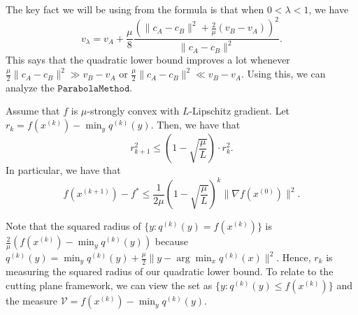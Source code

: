 The key fact we will be using from the formula is that when $0<\lambda<1$,
we have
\[
v_{\lambda}=v_{A}+\frac{\mu}{8}\frac{(\|c_{A}-c_{B}\|^{2}+\frac{2}{\mu}(v_{B}-v_{A}))^{2}}{\|c_{A}-c_{B}\|^{2}}.
\]
This says that the quadratic lower bound improves a lot whenever $\frac{\mu}{2}\|c_{A}-c_{B}\|^{2}\gg v_{B}-v_{A}$
or $\frac{\mu}{2}\|c_{A}-c_{B}\|^{2}\ll v_{B}-v_{A}$. Using this,
we can analyze the $\mathtt{ParabolaMethod}$.
\begin{thm}
\label{lem:geometric_convergence_rate-1}Assume that $f$ is $\mu$-strongly
convex with $L$-Lipschitz gradient. Let $r_{k}=f(x^{(k)})-\min_{y}q^{(k)}(y)$.
Then, we have that
\[
r_{k+1}^{2}\leq(1-\sqrt{\frac{\mu}{L}})\cdot r_{k}^{2}.
\]
In particular, we have that
\[
f(x^{(k+1)})-f^{*}\leq\frac{1}{2\mu}(1-\sqrt{\frac{\mu}{L}})^{k}\|\nabla f(x^{(0)})\|^{2}.
\]
\end{thm}

\begin{rem}
Note that the squared radius of $\{y:q^{(k)}(y)=f(x^{(k)})\}$ is
$\frac{2}{\mu}(f(x^{(k)})-\min_{y}q^{(k)}(y))$ because $q^{(k)}(y)=\min_{y}q^{(k)}(y)+\frac{\mu}{2}\|y-\arg\min_{x}q^{(k)}(x)\|^{2}$.
Hence, $r_{k}$ is measuring the squared radius of our quadratic lower
bound. To relate to the cutting plane framework, we can view the set
as $\{y:q^{(k)}(y)\leq f(x^{(k)})\}$ and the measure $\mathcal{V}=f(x^{(k)})-\min_{y}q^{(k)}(y)$.
\end{rem}

